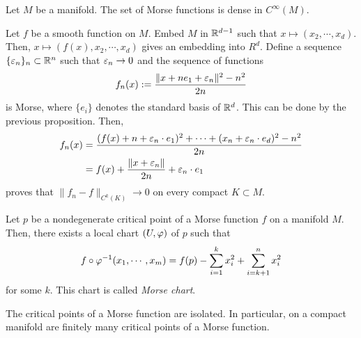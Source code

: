 \documentclass{../../large}
\begin{document}
\begin{prop}
Let $M$ be a manifold.
The set of Morse functions is dense in $C^\infty(M)$.
\end{prop}
\begin{pf}
Let $f$ be a smooth function on $M$.
Embed $M$ in $\mathbb{R}^{d-1}$ such that $x\mapsto(x_2,\cdots,x_d)$.
Then, $x\mapsto(f(x),x_2,\cdots,x_d)$ gives an embedding into $R^d$.
Define a sequence $\{\varepsilon_n\}_n\subset\mathbb{R}^n$ such that $\varepsilon_n\to0$ and the sequence of functions
\[f_n(x):=\frac{\|x+ne_1+\varepsilon_n\|^2-n^2}{2n}\]
is Morse, where $\{e_i\}$ denotes the standard basis of $\mathbb{R}^d$.
This can be done by the previous proposition.
Then,
\begin{align*}
f_n(x)&=\frac{(f(x)+n+\varepsilon_n\cdot e_1)^2+\cdots+(x_n+\varepsilon_n\cdot e_d)^2-n^2}{2n}\\
&=f(x)+\frac{\|x+\varepsilon_n\|}{2n}+\varepsilon_n\cdot e_1
\end{align*}
proves that $\|f_n-f\|_{C^k(K)}\to0$ on every compact $K\subset M$.
\end{pf}

\begin{thm}
Let $p$ be a nondegenerate critical point of a Morse function $f$ on a manifold $M$.
Then, there exists a local chart $(U,\varphi)$ of $p$ such that
\[f\circ\varphi^{-1}(x_1,\cdots,x_m)=f(p)-\sum_{i=1}^kx_i^2+\sum_{i=k+1}^nx_i^2\]
for some $k$.
This chart is called \emph{Morse chart}.
\end{thm}
\begin{pf}
\end{pf}
\begin{cor}
The critical points of a Morse function are isolated.
In particular, on a compact manifold are finitely many critical points of a Morse function.
\end{cor}
\end{document}
